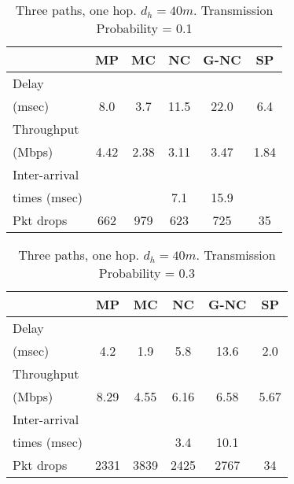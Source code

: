 \documentclass[journal, onecolumn, 12pt]{IEEEtran}
\begin{document}
\begin{table}[hb]
\begin{center}
\scriptsize
\begin{tabular}{|l|c|c|c|c|c|}
\hline
~                                    & MP & MC & NC & G-NC & SP \\ \hline
Delay           &   &   &  &  & \\
(msec)   & 8.0 & 3.7  & 11.5  & 22.0 & 6.4  \\ \hline
Throughput                   & ~  & ~  & ~  & ~         & ~  \\
(Mbps)                   & 4.42  & 2.38  & 3.11 & 3.47 & 1.84\\ \hline
Inter-arrival              & ~  & ~  & ~  & ~         & ~  \\
times (msec)   &   &   &  7.1 & 15.9 & \\ \hline
Pkt drops  & 662  & 979  & 623  & 725 & 35 \\ \hline
\end{tabular}
\end{center}
\caption {Three paths, one hop. $d_{h}=40m$. Transmission Probability = 0.1}
\label{tab:sim_topol_4_0.1}
\end{table}

\begin{table}[hb]
\begin{center}
\scriptsize
\begin{tabular}{|l|c|c|c|c|c|}
\hline
~                                    & MP & MC & NC & G-NC & SP \\ \hline
Delay           &   &   &  &  & \\
(msec)   & 4.2  & 1.9 & 5.8  & 13.6 & 2.0  \\ \hline
Throughput                   & ~  & ~  & ~  & ~         & ~  \\
(Mbps)                   & 8.29  & 4.55  & 6.16 & 6.58 & 5.67\\ \hline
Inter-arrival              & ~  & ~  & ~  & ~         & ~  \\
times (msec)   &   &   &  3.4 & 10.1 & \\ \hline
Pkt drops  & 2331  & 3839  & 2425  & 2767 & 34 \\ \hline
\end{tabular}
\end{center}
\caption {Three paths, one hop. $d_{h}=40m$. Transmission Probability = 0.3}
\label{tab:sim_topol_4_0.3}
\end{table}
\end{document}
